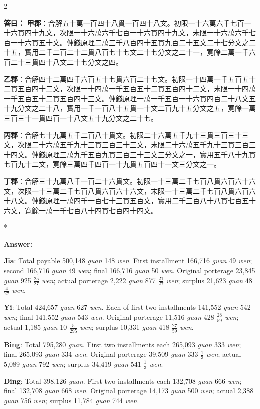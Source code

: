 \documentclass[11pt,a4paper]{article}
\newcommand{\CnAnswer}[1]{\par\noindent\textbf{\color{answercolor}答曰：}#1\par\vspace{0.5ex}}
\newcommand{\EnAnswer}{\par\noindent\textbf{\color{answercolor}Answer:}\par\vspace{0.5ex}}
\newcommand{\switchEn}{\switchcolumn[1]*}
\begin{document}
\begin{paracol}{2}

\CnAnswer{%
\textbf{甲郡}：合解五十萬一百四十八貫一百四十八文。初限一十六萬六千七百一十六貫四十九文，次限一十六萬六千七百一十六貫四十九文，未限一十六萬六千七百一十六貫五十文。傭錢原理二萬三千八百四十五貫九百二十五文二十七分文之二十五，實用二千二百二十二貫八百七十七文二十七分文之二十一，寛餘二萬一千六百二十三貫四十八文二十七分文之四。

\textbf{乙郡}：合解四十二萬四千六百五十七貫六百二十七文。初限一十四萬一千五百五十二貫五百四十二文，次限一十四萬一千五百五十二貫五百四十二文，末限一十四萬一千五百五十二貫五百四十三文。傭錢原理一萬一千五百一十六貫四百二十八文五十九分文之二十八，實用一千一百八十五貫一十文二百九十五分文之五，寛餘一萬三百三十一貫四百一十八文五十九分文之二十七。

\textbf{丙郡}：合解七十九萬五千二百八十貫文。初限二十六萬五千九十三貫三百三十三文，次限二十六萬五千九十三貫三百三十三文，末限二十六萬五千九十三貫三百三十四文。傭錢原理三萬九千五百九貫三百三十三文三分文之一，實用五千八十九貫七百九十二文，寛餘三萬四千四百一十九貫五百四十一文三分文之一。

\textbf{丁郡}：合解三十九萬八千一百二十六貫文。初限一十三萬二千七百八貫六百六十六文，次限一十三萬二千七百八貫六百六十六文，末限一十三萬二千七百八貫六百六十八文。傭錢原理一萬四千一百七十三貫五百文，實用二千三百八十八貫七百五十六文，寛餘一萬一千七百八十四貫七百四十四文。
}

\switchEn

\EnAnswer
\textbf{Jia}: Total payable 500,148 \textit{guan} 148 \textit{wen}. First installment 166,716 \textit{guan} 49 \textit{wen}; second 166,716 \textit{guan} 49 \textit{wen}; final 166,716 \textit{guan} 50 \textit{wen}. Original porterage 23,845 \textit{guan} 925 $\frac{25}{27}$ \textit{wen}; actual porterage 2,222 \textit{guan} 877 $\frac{21}{27}$ \textit{wen}; surplus 21,623 \textit{guan} 48 $\frac{4}{27}$ \textit{wen}.

\textbf{Yi}: Total 424,657 \textit{guan} 627 \textit{wen}. Each of first two installments 141,552 \textit{guan} 542 \textit{wen}; final 141,552 \textit{guan} 543 \textit{wen}. Original porterage 11,516 \textit{guan} 428 $\frac{28}{59}$ \textit{wen}; actual 1,185 \textit{guan} 10 $\frac{5}{295}$ \textit{wen}; surplus 10,331 \textit{guan} 418 $\frac{27}{59}$ \textit{wen}.

\textbf{Bing}: Total 795,280 \textit{guan}. First two installments each 265,093 \textit{guan} 333 \textit{wen}; final 265,093 \textit{guan} 334 \textit{wen}. Original porterage 39,509 \textit{guan} 333 $\frac{1}{3}$ \textit{wen}; actual 5,089 \textit{guan} 792 \textit{wen}; surplus 34,419 \textit{guan} 541 $\frac{1}{3}$ \textit{wen}.

\textbf{Ding}: Total 398,126 \textit{guan}. First two installments each 132,708 \textit{guan} 666 \textit{wen}; final 132,708 \textit{guan} 668 \textit{wen}. Original porterage 14,173 \textit{guan} 500 \textit{wen}; actual 2,388 \textit{guan} 756 \textit{wen}; surplus 11,784 \textit{guan} 744 \textit{wen}.

\end{paracol}
\end{document}

